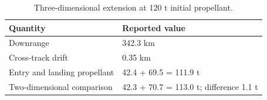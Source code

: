 \begin{table}[htbp]
\caption{Three-dimensional extension at 120 t initial propellant.}
\label{tab:src10}
\small
\setlength{\tabcolsep}{3.5pt}
\begin{tabularx}{\linewidth}{@{}p{.36\linewidth}X@{}}
\toprule
Quantity & Reported value \\
\midrule
Downrange & 342.3 km \\
Cross-track drift & 0.35 km \\
Entry and landing propellant & 42.4 + 69.5 = 111.9 t \\
Two-dimensional comparison & 42.3 + 70.7 = 113.0 t; difference 1.1 t \\
\bottomrule
\end{tabularx}
\par{}
\par{}
\end{table}

